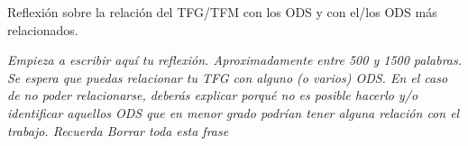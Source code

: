 \documentclass[11pt]{article}
\begin{document}
\newpage

Reflexi\'on sobre la relaci\'on del TFG/TFM con los ODS y con el/los ODS m\'as relacionados.

\vspace{1ex}

\textit{Empieza a escribir aquí tu reflexión. Aproximadamente entre 500 y 1500 palabras. Se
espera que puedas relacionar tu TFG con alguno (o varios) ODS. En el caso de no poder
relacionarse, deberás explicar porqué no es posible hacerlo y/o identificar aquellos ODS
que en menor grado podrían tener alguna relación con el trabajo. Recuerda Borrar toda
esta frase}
\end{document}
